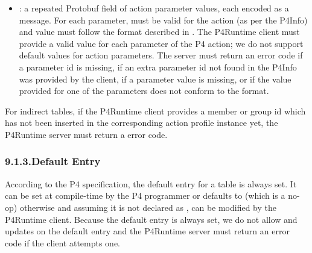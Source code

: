 \documentclass[11pt]{article}
\begin{document}
{\begin{itemize}
\item{}
: a repeated Protobuf field of action parameter values, each encoded
as a  message. For each parameter,  must be valid for the
action (as per the P4Info) and value must follow the format described in
. The P4Runtime client must provide a valid
value for each parameter of the P4 action; we do not support default values
for action parameters. The server must return an  error code
if a parameter id is missing, if an extra parameter \textemdash{} id not found in the
P4Info \textemdash{} was provided by the client, if a parameter value is missing, or if
the value provided for one of the parameters does not conform to the
 format.%
\end{itemize}%

\noindent{}For indirect tables, if the P4Runtime client provides a member or group id which
has not been inserted in the corresponding action profile instance yet, the
P4Runtime server must return a  error code.%

\subsubsection{9.1.3.\hspace*{0.5em}Default Entry}\label{sec-default-entry}%

\noindent{}According to the P4 specification, the default entry for a table is always set.
It can be set at compile-time by the P4 programmer \textemdash{} or defaults to 
(which is a no-op) otherwise \textemdash{} and assuming it is not declared as , can
be modified by the P4Runtime client. Because the default entry is always set, we
do not allow  and  updates on the default entry and the
P4Runtime server must return an  error code if the client
attempts one.%

}
\end{document}
